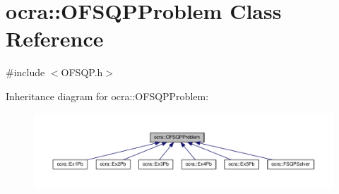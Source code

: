 \hypertarget{classocra_1_1OFSQPProblem}{}\section{ocra\+:\+:O\+F\+S\+Q\+P\+Problem Class Reference}
\label{classocra_1_1OFSQPProblem}


{\ttfamily \#include $<$O\+F\+S\+Q\+P.\+h$>$}



Inheritance diagram for ocra\+:\+:O\+F\+S\+Q\+P\+Problem\+:
\nopagebreak
\begin{figure}[H]
\begin{center}
\leavevmode
\includegraphics[width=350pt]{da/d7b/classocra_1_1OFSQPProblem__inherit__graph}
\end{center}
\end{figure}
